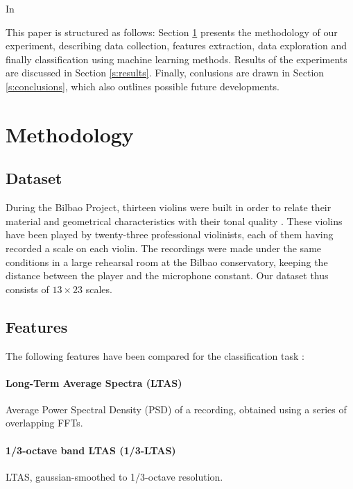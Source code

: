 \documentclass[letterpaper,11pt,leqno]{article}
\begin{document}
In \cite{zhaoViolinistIdentificationUsing2022}

This paper is structured as follows: Section \ref{s:methodology} presents the methodology of our experiment, describing data collection, features extraction, data exploration and finally classification using machine learning methods. Results of the experiments are discussed in Section \ref{s:results}. Finally, conlusions are drawn in Section \ref*{s:conclusions}, which also outlines possible future developments. 

\section{Methodology}\label{s:methodology}

\subsection{Dataset}

During the Bilbao Project, thirteen violins were built in order to relate their material and geometrical characteristics with their tonal quality \citep{fritzBilbaoProjectSearching2021}. These violins have been played by twenty-three professional violinists, each of them having recorded a scale on each violin. The recordings were made under the same conditions in a large rehearsal room at the Bilbao conservatory, keeping the distance between the player and the microphone constant. Our dataset thus consists of $13 \times 23$ scales.

\subsection{Features}

The following features have been compared for the classification task :

\paragraph*{Long-Term Average Spectra (LTAS)}{
	Average Power Spectral Density (PSD) of a recording, obtained using a series of overlapping FFTs.
}

\paragraph*{1/3-octave band LTAS (1/3-LTAS)}{
	LTAS, gaussian-smoothed to 1/3-octave resolution.
}
\end{document}
